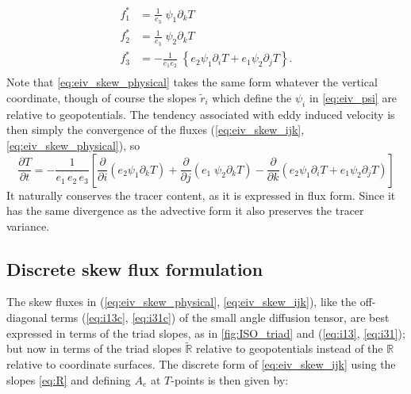 \documentclass[../tex_main/NEMO_manual]{subfiles}
\begin{document}
\begin{equation}\label{eq:eiv_skew_physical}
\begin{split}
 f^*_1 & = \frac{1}{e_{3}}\; \psi_1 \partial_k T   \\
 f^*_2 & = \frac{1}{e_{3}}\; \psi_2 \partial_k T   \\
 f^*_3 & =  -\frac{1}{e_{1}e_{2}}\; \left\{ e_{2} \psi_1 \partial_i T
   + e_{1} \psi_2 \partial_j T \right\}. \\
\end{split}
\end{equation}
Note that \autoref{eq:eiv_skew_physical} takes the same form whatever the vertical coordinate,
though of course the slopes $\tilde{r}_i$ which define the $\psi_i$ in \autoref{eq:eiv_psi} are relative to
geopotentials.
The tendency associated with eddy induced velocity is then simply the convergence of the fluxes
(\autoref{eq:eiv_skew_ijk}, \autoref{eq:eiv_skew_physical}), so
\begin{equation} \label{eq:skew_eiv_conv}
\frac{\partial T}{\partial t}= -\frac{1}{e_1 \, e_2 \, e_3 }      \left[
  \frac{\partial}{\partial i} \left( e_2 \psi_1 \partial_k T\right)
  + \frac{\partial}{\partial j} \left( e_1  \;
    \psi_2 \partial_k T\right)
 -  \frac{\partial}{\partial k} \left( e_{2} \psi_1 \partial_i T
   + e_{1} \psi_2 \partial_j T \right)  \right]
\end{equation}
It naturally conserves the tracer content, as it is expressed in flux form.
Since it has the same divergence as the advective form it also preserves the tracer variance.

\subsection{Discrete skew flux formulation}
The skew fluxes in (\autoref{eq:eiv_skew_physical}, \autoref{eq:eiv_skew_ijk}),
like the off-diagonal terms (\autoref{eq:i13c}, \autoref{eq:i31c}) of the small angle diffusion tensor,
are best expressed in terms of the triad slopes, as in \autoref{fig:ISO_triad} and
(\autoref{eq:i13}, \autoref{eq:i31});
but now in terms of the triad slopes $\tilde{\mathbb{R}}$ relative to geopotentials instead of
the $\mathbb{R}$ relative to coordinate surfaces.
The discrete form of \autoref{eq:eiv_skew_ijk} using the slopes \autoref{eq:R} and
defining $A_e$ at $T$-points is then given by:
\end{document}
